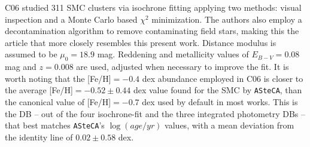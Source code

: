 \documentclass[draft]{aa}
\begin{document}
%
C06 studied 311 SMC clusters via isochrone fitting applying two methods: visual
inspection and a Monte Carlo based $\chi^2$ minimization. The authors also
employ a decontamination algorithm to remove contaminating field stars, making
this the article that more closely resembles this present work.
Distance modulus is assumed to be $\mu_0{=}18.9$ mag. Reddening and
metallicity values of $E_{B-V}{=}0.08$ mag and $z{=}0.008$ are used, adjusted
when necessary to improve the fit.
It is worth noting that the [Fe/H]${=}-0.4$ dex abundance employed in
C06 is closer to the average [Fe/H]${=}-0.52{\pm}0.44$ dex value found for the
SMC by \texttt{ASteCA}, than the canonical value of [Fe/H]${=}-0.7$ dex used by
default in most works.
This is the DB -- out of the four isochrone-fit and the three integrated
photometry DBs -- that best matches \texttt{ASteCA}'s $\log(age/yr)$ values,
with a mean deviation from the identity line of $0.02\pm0.58$ dex.

%
\end{document}
